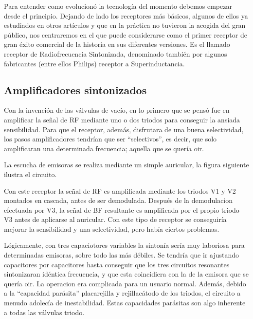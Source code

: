 \documentclass[letterpaper,10pt,spanish]{sphinxmanual}
\let\sphinxpxdimen\pdfpxdimen\else\newdimen\sphinxpxdimen
\begin{document}
Para entender como evolucionó la tecnología del momento debemos empezar desde el principio. Dejando de lado los receptores más básicos, algunos de ellos ya estudiados en otros artículos y que en la práctica no tuvieron la acogida del gran público, nos centraremos en el que puede considerarse como el primer receptor de gran éxito comercial de la historia en sus diferentes versiones. Es el llamado receptor de Radiofrecuencia Sintonizada, denominado también por algunos fabricantes (entre ellos
Philips) receptor a Superinductancia.


\subsection{Amplificadores sintonizados}
\label{\detokenize{introduccion/sistemas:Amplificadores-sintonizados}}
Con la invención de las válvulas de vacío, en lo primero que se pensó fue en amplificar la señal de RF mediante uno o dos triodos para conseguir la ansiada sensibilidad. Para que el receptor, además, disfrutara de una buena selectividad, los pasos amplificadores tendrían que ser “selectivos”, es decir, que solo amplificaran una determinada frecuencia; aquella que se quería oir.

La escucha de emisoras se realiza mediante un simple auricular, la figura siguiente ilustra el circuito.

\sphinxincludegraphics[width=588\sphinxpxdimen,height=210\sphinxpxdimen]{{receprfs1low}.png}

Con este receptor la señal de RF es amplificada mediante los triodos V1 y V2 montados en cascada, antes de ser demodulada. Después de la demodulacion efectuada por V3, la señal de BF resultante es amplificada por el propio triodo V3 antes de aplicarse al auricular. Con este tipo de receptor se conseguiría mejorar la sensibilidad y una selectividad, pero había ciertos problemas.

Lógicamente, con tres capaciotores variables la sintonía sería muy laboriosa para determinadas emisoras, sobre todo las más débiles. Se tendría que ir ajustando capacitores por capacitores hasta conseguir que los tres circuitos resonantes sintonizaran idéntica frecuencia, y que esta coincidiera con la de la emisora que se quería oir. La operacion era complicada para un usuario normal. Además, debido a la “capacidad parásita” placa\sphinxhyphen{}rejilla y rejilla\sphinxhyphen{}cátodo de los triodos, el circuito a menudo
adolecía de inestabilidad. Estas capacidades parásitas son algo inherente a todas las válvulas triodo.
\end{document}
